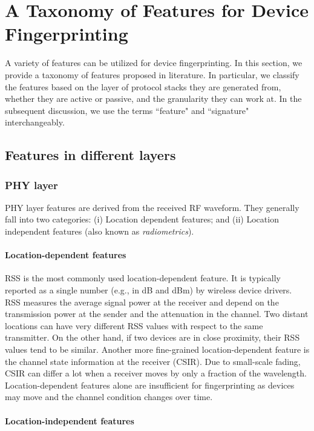 \documentclass[journal,draftcls,onecolumn,11pt]{IEEEtran}
\begin{document}
\section{A Taxonomy of Features for Device Fingerprinting}
\label{sect:feature}

A variety of features can be utilized for device fingerprinting. In this section, we provide a taxonomy of features proposed in literature.  In particular, we classify the features based on the layer of protocol stacks they are generated from, whether they are active or passive, and the granularity they can work at. In the subsequent discussion, we use the terms ``feature" and ``signature" interchangeably.

\subsection{Features in different layers}
\subsubsection{PHY layer}
PHY layer features are derived from the received RF waveform.  They generally fall into two categories: (i) Location dependent features; and (ii) Location independent features (also known as {\it radiometrics}).

\paragraph*{Location-dependent features}

RSS is the most commonly used location-dependent feature. It is typically reported as a single number (e.g., in dB and dBm) by  wireless device drivers.  RSS measures the average signal power at the receiver and depend on the transmission power at the sender and the attenuation in the channel. Two distant locations can have very different RSS values with respect to the same transmitter. On the other hand, if two devices are in close proximity, their RSS values tend to be similar. Another more fine-grained location-dependent feature is the channel state information at the receiver (CSIR). Due to small-scale fading, CSIR can differ a lot when a receiver moves by only a fraction of the wavelength. Location-dependent features alone are insufficient for fingerprinting as devices may move and the channel condition changes over time.

\paragraph*{Location-independent features}
\end{document}
